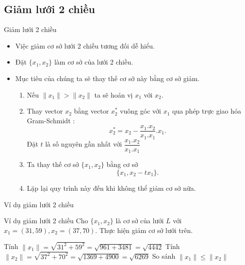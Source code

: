 \documentclass{beamer}
\numberwithin{equation}{section}
\begin{document}
\subsection{Giảm lưới 2 chiều}
\begin{frame}{Giảm lưới 2 chiều}
\begin{itemize}
\item Việc giảm cơ sở lưới 2 chiều tương đối dễ hiểu.
\item Đặt $\{x_1, x_2\}$ làm cơ sở của lưới 2 chiều.
\item Mục tiêu của chúng ta sẽ thay thế cơ sở này bằng cơ sở giảm.
\begin{enumerate}
\item Nếu $\|x_1\| > \|x_2\|$ ta sẽ hoán vị $x_1$ với $x_2$.
\item Thay vector $x_2$ bằng vector $x_2^*$ vuông góc với $x_1$ qua phép trực giao hóa Gram-Schmidt :
$$x_2^* = x_2 - \frac{x_1.x_2}{x_1.x_1}.x_1 \text{.}$$ Đặt $t$ là số nguyên gần nhất với $\dfrac{x_1.x_2}{x_1.x_1}$
\item Ta thay thế cơ sở $\{x_1, x_2 \}$ bằng cơ sở $$\{x_1, x_2 - tx_1\}\text{.}$$
\item Lặp lại quy trình này đến khi không thể giảm cơ sở nữa.
\end{enumerate}
\end{itemize}
\end{frame}
\begin{frame}{Ví dụ giảm lưới 2 chiều}

\begin{block}{Ví dụ giảm lưới 2 chiều}
Cho $\{x_1, x_2\}$ là cơ sở của lưới $L$ với $x_1 = (31, 59), x_2 = (37, 70)$. Thực hiện giảm cơ sở lưới trên.
\end{block}

Tính $\|x_1\|= \sqrt{31^2 + 59^2} = \sqrt{961 + 3481} = \sqrt{4442} $
Tính $ \|x_2\| = \sqrt{37^2 + 70^2} = \sqrt{1369 + 4900} = \sqrt{6269} $
So sánh $\|x_1\| \leq \|x_2\|$



\end{frame}
\end{document}
